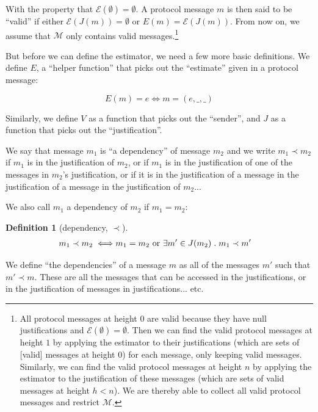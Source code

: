 \documentclass{article}
\theoremstyle{definition}
\newtheorem{defn}{Definition}[section]
\begin{document}
With the property that $\mathcal{E}(\emptyset) = \emptyset$. A protocol message $m$ is then said to be ``valid'' if either $\mathcal{E}(J(m)) = \emptyset$ or $E(m) = \mathcal{E}(J(m))$. From now on, we assume that $\mathcal{M}$ only contains valid messages.\footnote{All protocol messages at height $0$ are valid because they have null justifications and $\mathcal{E}(\emptyset) = \emptyset$. Then we can find the valid protocol messages at height $1$ by applying the estimator to their justifications (which are sets of [valid] messages at height 0) for each message, only keeping valid messages. Similarly, we can find the valid protocol messages at height $n$ by applying the estimator to the justification of these messages (which are sets of valid messages at height $h < n$). We are thereby able to collect all valid protocol messages and restrict $\mathcal{M}.$}


But before we can define the estimator, we need a few more basic definitions. We define $E$, a ``helper function'' that picks out the ``estimate'' given in a protocol message:

$$
E(m) = e \iff m = (e, \_, \_)
$$

Similarly, we define $V$ as a function that picks out the ``sender'', and $J$ as a function that picks out the ``justification''.

We say that message $m_1$ is ``a dependency'' of message $m_2$ and we write $m_1 \prec m_2$ if $m_1$ is in the justification of $m_2$, or if $m_1$ is in the justification of one of the messages in $m_2$'s justification, or if it is in the justification of a message in the justification of a message in the justification of $m_2$...

We also call $m_1$ a dependency of $m_2$ if $m_1 = m_2$:

\begin{defn}[dependency, $\prec$]
\begin{equation*}
\begin{split}
m_1 \prec m_2 \iff & m_1 = m_2 \text{ or } \exists m' \in J(m_2) \hspace{1mm} . \hspace{1mm} m_1 \prec m'
\end{split}
\end{equation*}
\end{defn}

We define ``the dependencies'' of a message $m$ as all of the messages $m'$ such that $m' \prec m$. These are all the messages that can be accessed in the justifications, or in the justification of messages in justifications... etc.
\end{document}
